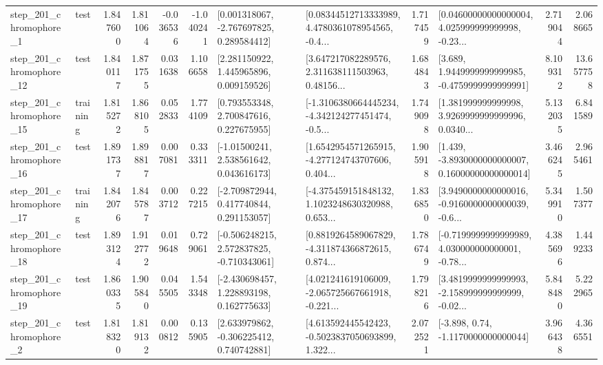 \begin{tabular}{llrrrrllrlrr}
   step\_201\_chromophore\_1 &      test &      1.847600 &    1.811064 &     -0.036536 & -1.040241 &    [0.001318067, -2.767697825, 0.289584412] &  [0.08344512713333989, 4.4780361078954565, -0.4... &       1.717459 &  [0.04600000000000004, 4.025999999999998, -0.23... &            2.719044 &          2.068665 \\
  step\_201\_chromophore\_12 &      test &      1.840117 &    1.871755 &      0.031638 &  1.106658 &     [2.281150922, 1.445965896, 0.009159526] &  [3.647217082289576, 2.311638111503963, 0.48156... &       1.684843 &   [3.689, 1.9449999999999985, -0.4759999999999991] &            8.109312 &         13.657758 \\
  step\_201\_chromophore\_15 &  training &      1.815272 &    1.868105 &      0.052833 &  1.774109 &     [0.793553348, 2.700847616, 0.227675955] &  [-1.3106380664445234, -4.342124277451474, -0.5... &       1.749098 &  [1.381999999999998, 3.9269999999999996, 0.0340... &            5.132035 &          6.841589 \\
  step\_201\_chromophore\_16 &      test &      1.891737 &    1.898817 &      0.007081 &  0.333311 &     [-1.01500241, 2.538561642, 0.043616173] &  [1.6542954571265915, -4.277124743707606, 0.404... &       1.905918 &  [1.439, -3.8930000000000007, 0.16000000000000014] &            3.466245 &          2.965461 \\
  step\_201\_chromophore\_17 &  training &      1.842076 &    1.845787 &      0.003712 &  0.227215 &    [-2.709872944, 0.417740844, 0.291153057] &  [-4.375459151848132, 1.1023248630320988, 0.653... &       1.836850 &  [3.9490000000000016, -0.9160000000000039, -0.6... &            5.349910 &          1.507377 \\
  step\_201\_chromophore\_18 &      test &      1.893124 &    1.912772 &      0.019648 &  0.729061 &   [-0.506248215, 2.572837825, -0.710343061] &  [0.8819264589067829, -4.311874366872615, 0.874... &       1.786749 &  [-0.7199999999999989, 4.030000000000001, -0.78... &            4.385696 &          1.449233 \\
  step\_201\_chromophore\_19 &      test &      1.860335 &    1.905840 &      0.045505 &  1.543348 &    [-2.430698457, 1.228893198, 0.162775633] &  [4.021241619106009, -2.065725667661918, -0.221... &       1.798216 &  [3.4819999999999993, -2.158999999999999, -0.02... &            5.848480 &          5.222965 \\
   step\_201\_chromophore\_2 &      test &      1.818320 &    1.819132 &      0.000812 &  0.135905 &    [2.633979862, -0.306225412, 0.740742881] &  [4.613592445542423, -0.5023837050693899, 1.322... &       2.072521 &                [-3.898, 0.74, -1.1170000000000044] &            3.966438 &          4.366551 \\

\end{tabular}
